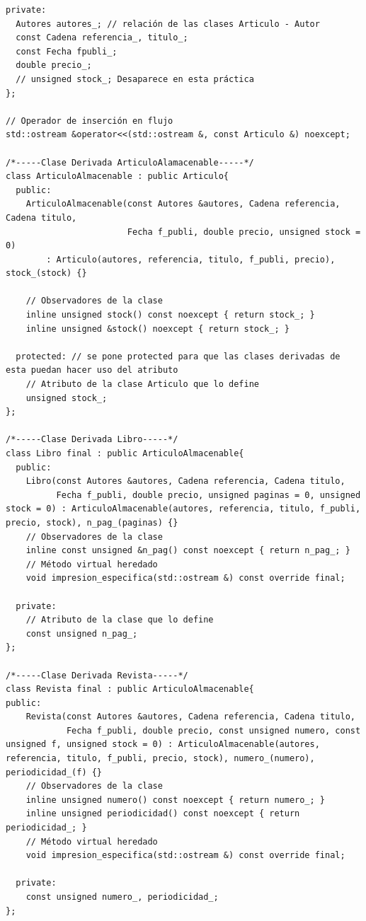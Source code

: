 \begin{verbatim}
private:
  Autores autores_; // relación de las clases Articulo - Autor
  const Cadena referencia_, titulo_;
  const Fecha fpubli_;
  double precio_;
  // unsigned stock_; Desaparece en esta práctica
};

// Operador de inserción en flujo
std::ostream &operator<<(std::ostream &, const Articulo &) noexcept;

/*-----Clase Derivada ArticuloAlamacenable-----*/
class ArticuloAlmacenable : public Articulo{
  public:
    ArticuloAlmacenable(const Autores &autores, Cadena referencia, Cadena titulo,
                        Fecha f_publi, double precio, unsigned stock = 0)
        : Articulo(autores, referencia, titulo, f_publi, precio), stock_(stock) {}

    // Observadores de la clase
    inline unsigned stock() const noexcept { return stock_; }
    inline unsigned &stock() noexcept { return stock_; }

  protected: // se pone protected para que las clases derivadas de esta puedan hacer uso del atributo
    // Atributo de la clase Articulo que lo define
    unsigned stock_;
};

/*-----Clase Derivada Libro-----*/
class Libro final : public ArticuloAlmacenable{
  public:
    Libro(const Autores &autores, Cadena referencia, Cadena titulo,
          Fecha f_publi, double precio, unsigned paginas = 0, unsigned stock = 0) : ArticuloAlmacenable(autores, referencia, titulo, f_publi, precio, stock), n_pag_(paginas) {}
    // Observadores de la clase
    inline const unsigned &n_pag() const noexcept { return n_pag_; }
    // Método virtual heredado
    void impresion_especifica(std::ostream &) const override final;

  private:
    // Atributo de la clase que lo define
    const unsigned n_pag_;
};

/*-----Clase Derivada Revista-----*/
class Revista final : public ArticuloAlmacenable{
public:
    Revista(const Autores &autores, Cadena referencia, Cadena titulo,
            Fecha f_publi, double precio, const unsigned numero, const unsigned f, unsigned stock = 0) : ArticuloAlmacenable(autores, referencia, titulo, f_publi, precio, stock), numero_(numero), periodicidad_(f) {}
    // Observadores de la clase
    inline unsigned numero() const noexcept { return numero_; }
    inline unsigned periodicidad() const noexcept { return periodicidad_; }
    // Método virtual heredado
    void impresion_especifica(std::ostream &) const override final;

  private:
    const unsigned numero_, periodicidad_;
};


\end{verbatim}

